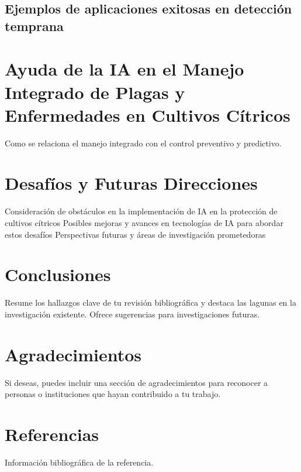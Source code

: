 \documentclass[12pt]{article}
\begin{document}
\subsection{Ejemplos de aplicaciones exitosas en detección temprana}

\section{Ayuda de la IA en el Manejo Integrado de Plagas y Enfermedades en Cultivos Cítricos}
Como se relaciona el manejo integrado con el control preventivo y predictivo. 

\section{Desafíos y Futuras Direcciones}
Consideración de obstáculos en la implementación de IA en la protección de cultivos cítricos 
Posibles mejoras y avances en tecnologías de IA para abordar estos desafíos
Perspectivas futuras y áreas de investigación prometedoras



\section{Conclusiones}
Resume los hallazgos clave de tu revisión bibliográfica y destaca las lagunas en la investigación existente. Ofrece sugerencias para investigaciones futuras.

\section*{Agradecimientos}
Si deseas, puedes incluir una sección de agradecimientos para reconocer a personas o instituciones que hayan contribuido a tu trabajo.

\section*{Referencias}
\begin{thebibliography}{99}
 Información bibliográfica de la referencia.
\end{thebibliography}
\end{document}
